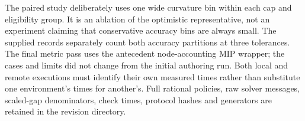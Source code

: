 The paired study deliberately uses one wide curvature bin within each cap and eligibility group. It is an ablation of the optimistic representative, not an experiment claiming that conservative accuracy bins are always small. The supplied records separately count both accuracy partitions at three tolerances. The final metric pass uses the antecedent node-accounting MIP wrapper; the cases and limits did not change from the initial authoring run. Both local and remote executions must identify their own measured times rather than substitute one environment's times for another's. Full rational policies, raw solver messages, scaled-gap denominators, check times, protocol hashes and generators are retained in the revision directory.
